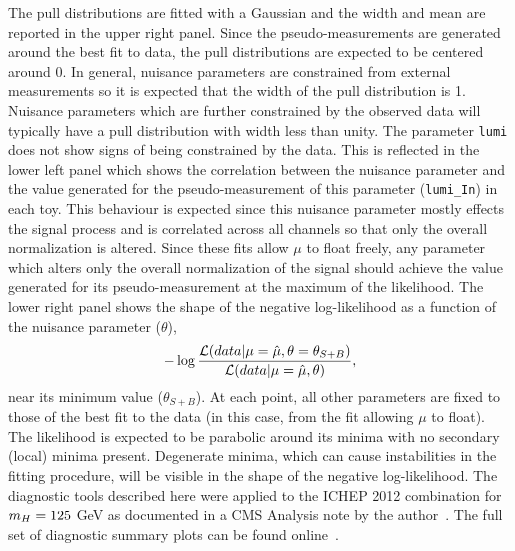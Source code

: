 The pull distributions are fitted with a Gaussian and the width and mean 
are reported in the upper right panel. Since the pseudo-measurements 
are generated around the best fit to data, the pull distributions
are expected to be centered around 0. In general, nuisance parameters
are constrained from external measurements so it is expected that the 
width of the pull distribution is 1. Nuisance parameters which are further
constrained by the observed data will typically have a pull distribution with width less
than unity. The parameter \texttt{lumi} does not show signs of being constrained
by the data. 
This is reflected in the lower left panel which shows the correlation between
the nuisance parameter and the value generated for the pseudo-measurement
of this parameter (\texttt{lumi\_In}) in each toy.
This behaviour is expected since this nuisance parameter mostly effects the signal process and 
is correlated across all channels so that only the overall
normalization is altered. Since these fits allow $\mu$ to float freely, 
any parameter which alters only the overall normalization of the signal should 
achieve the value generated for its pseudo-measurement at the maximum of the likelihood. 
The lower right panel shows the shape of the negative log-likelihood
as a function of the nuisance parameter ($\theta$),
\begin{equation}
-\log \frac{\displaystyle \mathcal{L}(data|\mu=\hat{\mu},\theta=\theta_{S+B})}
		 {\displaystyle \mathcal{L}(data|\mu=\hat{\mu},\theta)},
\end{equation}
near its minimum value ($\theta_{S+B}$).
At each point, all other parameters are fixed 
to those of the best fit to the data (in this case, from the fit allowing $\mu$ to float).
The likelihood is expected to be parabolic around its minima with no secondary (local) 
minima present.
Degenerate minima, which can cause instabilities in the fitting procedure, will be visible in the 
shape of the negative log-likelihood. The diagnostic tools described here were applied
to the ICHEP 2012 combination for $m_{H}=125$ GeV as documented in a CMS Analysis note by the 
author~\citep{AN-12-317}. 
The full set of diagnostic summary plots can be found online~\citep{onlinediag}.
